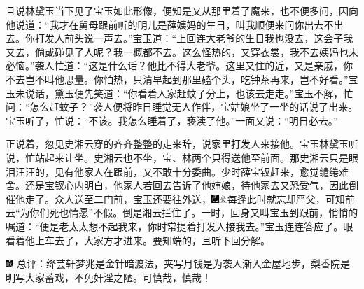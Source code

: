 且说林黛玉当下见了宝玉如此形像，便知是又从那里着了魔来，也不便多问，因向他说道：``我才在舅母跟前听的明儿是薛姨妈的生日，叫我顺便来问你出去不出去。你打发人前头说一声去。''宝玉道：``上回连大老爷的生日我也没去，这会子我又去，倘或碰见了人呢？我一概都不去。这么怪热的，又穿衣裳，我不去姨妈也未必恼。''袭人忙道：``这是什么话？他比不得大老爷。这里又住的近，又是亲戚，你不去岂不叫他思量。你怕热，只清早起到那里磕个头，吃钟茶再来，岂不好看。''宝玉未说话，黛玉便先笑道：``你看着人家赶蚊子分上，也该去走走。''宝玉不解，忙问：``怎么赶蚊子？''袭人便将昨日睡觉无人作伴，宝姑娘坐了一坐的话说了出来。宝玉听了，忙说：``不该。我怎么睡着了，亵渎了他。''一面又说：``明日必去。''

正说着，忽见史湘云穿的齐齐整整的走来辞，说家里打发人来接他。宝玉林黛玉听说，忙站起来让坐。史湘云也不坐，宝、林两个只得送他至前面。那史湘云只是眼泪汪汪的，见有他家人在跟前，又不敢十分委曲。少时薛宝钗赶来，愈觉缱绻难舍。还是宝钗心内明白，他家人若回去告诉了他婶娘，待他家去又恐受气，因此倒催他走了。众人送至二门前，宝玉还要往外送，{\includegraphics[width=3mm]{../Images/00003}\includegraphics[width=3mm]{../Images/00012}\footnotesize \kaishu 每逢此时就忘却严父，可知前云``为你们死也情愿''不假。}倒是湘云拦住了。一时，回身又叫宝玉到跟前，悄悄的嘱道：``便是老太太想不起我来，你时常提着打发人接我去。''宝玉连连答应了。眼看着他上车去了，大家方才进来。要知端的，且听下回分解。

{\includegraphics[width=3mm]{../Images/00005}  \kaishu 总评：绛芸轩梦兆是金针暗渡法，夹写月钱是为袭人渐入金屋地步，梨香院是明写大家蓄戏，不免奸淫之陋。可慎哉，慎哉！}

